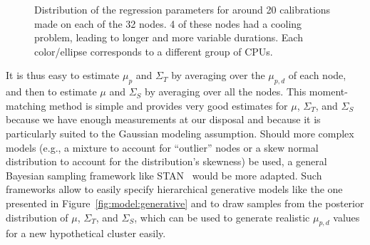 \begin{figure}[htpb]
                \caption{Distribution of the regression parameters for around 20
                    \dgemm calibrations made on each of the 32 nodes. 4 of
                    these nodes had a cooling problem, leading to longer and more
                    variable durations. Each
                    color/ellipse corresponds to a different group of CPUs.}
                \label{fig:whatif_slow}
            \end{figure}

            It is thus easy to estimate \(\mu_{p}\) and \(\Sigma_T\) by averaging over the \(\mu_{p,d}\) of each node,
            and then to estimate \(\mu\) and \(\Sigma_S\) by averaging over all the nodes. This moment-matching method
            is simple and provides very good estimates for \(\mu\), \(\Sigma_T\), and \(\Sigma_S\) because we have
            enough measurements at our disposal and because it is particularly suited to the Gaussian modeling
            assumption. Should more complex models (e.g., a mixture to account for ``outlier'' nodes or a skew normal
            distribution to account for the distribution's skewness) be used, a general Bayesian sampling framework like
            STAN~\cite{stan} would be more adapted. Such frameworks allow to easily specify hierarchical generative
            models like the one presented in Figure~\ref{fig:model:generative} and to draw samples from the posterior
            distribution of \(\mu\), \(\Sigma_T\), and \(\Sigma_S\), which can be used to generate realistic
            \(\mu_{p,d}\) values for a new hypothetical cluster easily.

